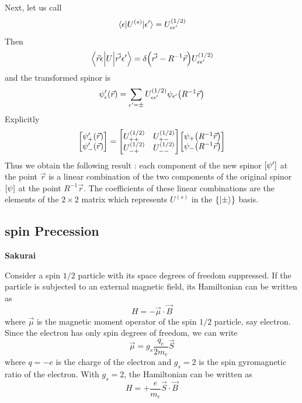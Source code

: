 Next, let us call
\begin{equation}
\mel{\epsilon}{U^{(s)}}{\epsilon^\prime} = U^{(1/2)}_{\epsilon\epsilon^\prime}
\end{equation}
Then
\begin{equation}
\mel{\vec{r}\epsilon}{U}{\vec{r^\prime}\epsilon^\prime} = \delta\qty(\vec{r^\prime} - R^{-1}\vec{r}) U^{(1/2)}_{\epsilon\epsilon^\prime}
\end{equation}
and the transformed spinor is
\begin{equation}
\psi^\prime_{\epsilon}\qty(\vec{r}) = \sum_{\epsilon^\prime = \pm} U^{(1/2)}_{\epsilon\epsilon^\prime} \psi_{\epsilon^\prime}\qty(R^{-1} \vec{r})
\end{equation}
Explicitly
\begin{equation}
\mqty[\psi^\prime_{+}\qty(\vec{r}) \\ \psi^\prime_{-}\qty(\vec{r})] = \mqty[U^{(1/2)}_{++} & U^{(1/2)}_{+-} \\ U^{(1/2)}_{-+} & U^{(1/2)}_{--}] \mqty[\psi_{+}\qty(R^{-1} \vec{r}) \\ \psi_{-}\qty(R^{-1} \vec{r}) ]
\end{equation}
Thus we obtain the following result : each component of the new spinor $\qty[\psi^\prime]$ at the point $\vec{r}$ is a linear combination of the two components of the original spinor $\qty[\psi]$ at the point $R^{-1}\vec{r}$. The coefficients of these linear combinations are the elements of the $2\times 2$ matrix which represents $U^{(s)}$ in the $\{\ket{\pm}\}$ basis.




\subsection{spin Precession}
\textbf{Sakurai}

Consider a spin $1/2$ particle with its space degrees of freedom suppressed. If the particle is subjected to an external magnetic field, its Hamiltonian can be written as
\begin{equation}
\label{chapter18.eqn1-spin-precession}
H = -\vec{\mu} \cdot \vec{B}
\end{equation}
where $\vec{\mu}$ is the magnetic moment operator of the spin $1/2$ particle, say electron. Since the electron has only spin degrees of freedom, we can write
\begin{equation}
\label{chapter18.eqn2-spin-precession}
\vec{\mu} = g_s \frac{q_e}{2 m_e} \vec{S}
\end{equation}
where $q=-e$ is the charge of the electron and $g_s=2$ is the spin gyromagnetic ratio of the electron. With $g_s=2$, the Hamiltonian can be written as
\begin{equation}
\label{chapter18.eqn3-spin-precession}
H = + \frac{e}{m_e} \vec{S}\cdot\vec{B}
\end{equation}


